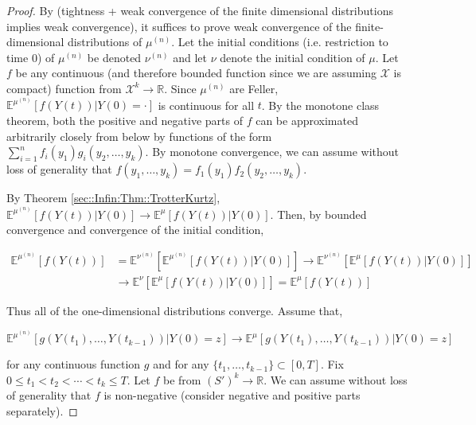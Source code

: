 \documentclass[12pt]{article}
\newcommand{\mb}{\mathbb}
\newcommand{\mc}{\mathcal}
\newcommand{\ra}{\rightarrow}
\newcommand{\ind}{\hspace{24pt}}
\newcommand{\exmu}[2]{\mb{E}^{#1}\left[#2\right]}	%
\renewcommand{\t}{t}							%
\newcommand{\tp}[1]{(#1)}						%
\newcommand{\sln}[1]{^{(#1)}}					%
\newcommand{\indx}[1]{_{#1}}					%
\newcommand{\m}{\mu}							%
\newcommand{\mm}{\nu}							%
\newcommand{\XX}{Y}								%
\renewcommand{\it}{k}							%
\newcommand{\spce}{\mc{X}}						%
\newcommand{\xx}{y}								%
\newcommand{\xxx}{z}							%
\begin{document}
\begin{proof}
By \cite[Theorem 13.1]{Bil99} (tightness + weak convergence of the finite dimensional distributions implies weak convergence), it suffices to prove weak convergence of the finite-dimensional distributions of \(\m\sln{n}\). Let the initial conditions (i.e. restriction to time 0) of \(\m\sln{n}\) be denoted \(\mm\sln{n}\) and let \(\mm\) denote the initial condition of \(\m\). Let \(f\) be any continuous (and therefore bounded function since we are assuming \(\spce\) is compact) function from \(\spce^k\ra\mb{R}\). Since \(\m\sln{n}\) are Feller, \(\exmu{\m\sln{n}}{f(\XX\tp{\t})|\XX\tp{0} = \cdot}\) is continuous for all \(\t\). By the monotone class theorem, both the positive and negative parts of \(f\) can be approximated arbitrarily closely from below by functions of the form \(\sum_{i=1}^n f\indx{i}(\xx\indx{1})g\indx{i}(\xx\indx{2},\dots,\xx\indx{\it})\). By monotone convergence, we can assume without loss of generality that \(f(\xx\indx{1},\dots,\xx\indx{\it}) = f\indx{1}(\xx\indx{1})f\indx{2}(\xx\indx{2},\dots,\xx\indx{\it})\).

\ind By Theorem \ref{sec::Infin:Thm::TrotterKurtz}, \(\exmu{\m\sln{n}}{f(\XX\tp{\t})|\XX\tp{0}} \ra \exmu{\m}{f(\XX\tp{\t})|\XX\tp{0}}\). Then, by bounded convergence and convergence of the initial condition,

\begin{align*}
\exmu{\m\sln{n}}{f(\XX\tp{\t})} & = \exmu{\mm\sln{n}}{\exmu{\m\sln{n}}{f(\XX\tp{\t})|\XX\tp{0}}} \ra \exmu{\mm\sln{n}}{\exmu{\m}{f(\XX\tp{\t})|\XX\tp{0}}}\\
& \ra \exmu{\mm}{\exmu{\m}{f(\XX\tp{\t})|\XX\tp{0}}} = \exmu{\m}{f(\XX\tp{\t})}
\end{align*}


Thus all of the one-dimensional distributions converge. Assume that,

\[\exmu{\m\sln{n}}{g(\XX\tp{\t\indx{1}},\dots,\XX\tp{\t\indx{k-1}})|\XX\tp{0}=\xxx} \ra \exmu{\m}{g(\XX\tp{\t\indx{1}},\dots,\XX\tp{\t\indx{k-1}})|\XX\tp{0}=\xxx}\]

\noindent for any continuous function \(g\) and for any \(\{\t\indx{1},\dots,\t\indx{k-1}\} \subset [0,T]\). Fix \(0\leq \t\indx{1} <\t\indx{2} <\cdots < \t\indx{\it}\leq T\). Let \(f\) be from \((S')^k \ra \mb{R}\). We can assume without loss of generality that \(f\) is non-negative (consider negative and positive parts separately).


\end{proof}
\end{document}
